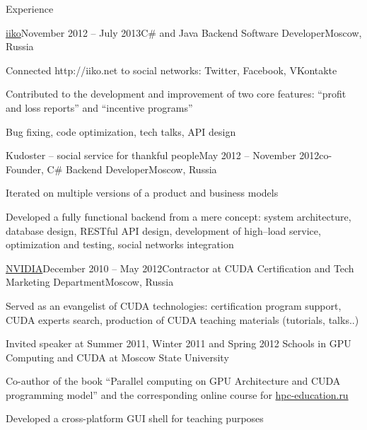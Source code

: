 \documentclass{resume} %
\begin{document}
\begin{rSection}{Experience}

\begin{rSubsection}{\href{http://en.iiko.ru}{iiko}}{November 2012 -- July 2013}{C\# and Java Backend Software Developer}{Moscow, Russia}
\item Connected http://iiko.net to social networks: Twitter, Facebook, VKontakte
\item Contributed to the development and improvement of two core features: ``profit and loss reports'' and ``incentive programs''
\item Bug fixing, code optimization, tech talks, API design
\end{rSubsection}


\begin{rSubsection}{Kudoster -- social service for thankful people}{May 2012 -- November 2012}{co-Founder, C\# Backend Developer}{Moscow, Russia}
\item Iterated on multiple versions of a product and business models
\item Developed a fully functional backend from a mere concept: system architecture, database design, RESTful API design, development of high–load service, optimization and testing, social networks integration
\end{rSubsection}


\begin{rSubsection}{\href{http://nvidia.ru}{NVIDIA}}{December 2010 -- May 2012}{Contractor at CUDA Certification and Tech Marketing Department}{Moscow, Russia}
\item Served as an evangelist of CUDA technologies: certification program support, CUDA experts search, production of CUDA teaching materials (tutorials, talks..)
\item Invited speaker at Summer 2011, Winter 2011 and Spring 2012 Schools in GPU Computing and CUDA at Moscow State University
\item Co-author of the book ``Parallel computing on GPU Architecture and CUDA programming model'' and the corresponding online course for \href{http://hpc-education.ru}{hpc-education.ru}
\item Developed a cross-platform GUI shell for teaching purposes
\end{rSubsection}



\end{rSection}
\end{document}
